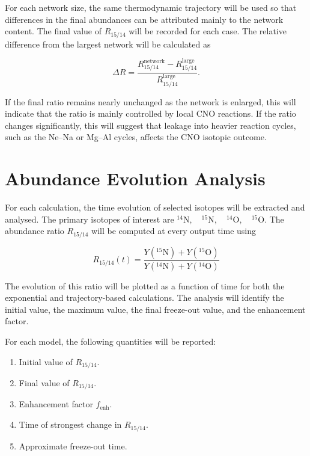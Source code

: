 For each network size, the same thermodynamic trajectory will be used so that differences in the final abundances can be attributed mainly to the network content. The final value of $R_{15/14}$ will be recorded for each case. The relative difference from the largest network will be calculated as

\begin{equation}
    \Delta R =
\frac{
R_{15/14}^{\mathrm{network}}
-
R_{15/14}^{\mathrm{large}}
}
{
R_{15/14}^{\mathrm{large}}
}.
\end{equation}

If the final ratio remains nearly unchanged as the network is enlarged, this will indicate that the ratio is mainly controlled by local CNO reactions. If the ratio changes significantly, this will suggest that leakage into heavier reaction cycles, such as the Ne--Na or Mg--Al cycles, affects the CNO isotopic outcome.

\section{Abundance Evolution Analysis}

For each calculation, the time evolution of selected isotopes will be extracted and analysed. The primary isotopes of interest are $^{14}\mathrm{N},\quad ^{15}\mathrm{N},\quad ^{14}\mathrm{O},\quad ^{15}\mathrm{O}$. The abundance ratio $R_{15/14}$ will be computed at every output time using

\begin{equation}
    R_{15/14}(t) =
\frac{Y(^{15}\mathrm{N})+Y(^{15}\mathrm{O})}
{Y(^{14}\mathrm{N})+Y(^{14}\mathrm{O})}
\end{equation}

The evolution of this ratio will be plotted as a function of time for both the exponential and trajectory-based calculations. The analysis will identify the initial value, the maximum value, the final freeze-out value, and the enhancement factor.

For each model, the following quantities will be reported:

\begin{enumerate}
    \item Initial value of $R_{15/14}$.
    \item Final value of $R_{15/14}$.
    \item Enhancement factor $f_{\mathrm{enh}}$.
    \item Time of strongest change in $R_{15/14}$.
    \item Approximate freeze-out time.
\end{enumerate}

